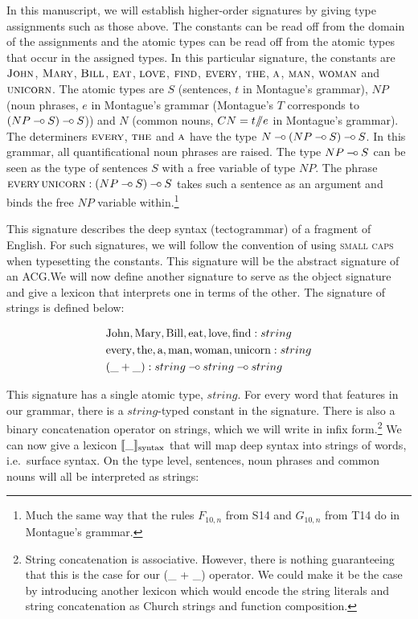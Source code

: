 In this manuscript, we will establish higher-order signatures by giving
type assignments such as those above. The constants can be read off from
the domain of the assignments and the atomic types can be read off from the
atomic types that occur in the assigned types. In this particular
signature, the constants are $\textsc{John}$, $\textsc{Mary}$, $\textsc{Bill}$,
$\textsc{eat}$, $\textsc{love}$, $\textsc{find}$, $\textsc{every}$, $\textsc{the}$,
$\textsc{a}$, $\textsc{man}$, $\textsc{woman}$ and $\textsc{unicorn}$. The atomic types
are $S$ (sentences, $t$ in Montague's grammar), $NP$ (noun phrases, $e$ in
Montague's grammar (Montague's $T$ corresponds to $(NP \mathbin{{-}\mkern-3.5mu{\circ}} S) \mathbin{{-}\mkern-3.5mu{\circ}} S$))
and $N$ (common nouns, $CN = t /\!\!/ e$ in Montague's grammar). The
determiners $\textsc{every}$, $\textsc{the}$ and $\textsc{a}$ have the type
$N \mathbin{{-}\mkern-3.5mu{\circ}} (NP \mathbin{{-}\mkern-3.5mu{\circ}} S) \mathbin{{-}\mkern-3.5mu{\circ}} S$. In this grammar, all quantificational noun
phrases are raised. The type $NP \mathbin{{-}\mkern-3.5mu{\circ}} S$ can be seen as the type of
sentences $S$ with a free variable of type $NP$. The phrase
$\textsc{every}\,\textsc{unicorn} : (NP \mathbin{{-}\mkern-3.5mu{\circ}} S) \mathbin{{-}\mkern-3.5mu{\circ}} S$ takes such a
sentence as an argument and binds the free $NP$ variable
within.\footnote{Much the same way that the rules $F_{10,n}$ from S14 and
  $G_{10,n}$ from T14 do in Montague's grammar.}

This signature describes the deep syntax (tectogrammar) of a fragment of
English. For such signatures, we will follow the convention of using
\textsc{small caps} when typesetting the constants. This signature will be
the abstract signature of an ACG.\@ We will now define another signature to
serve as the object signature and give a lexicon that interprets one in
terms of the other. The signature of strings is defined below:

\begin{align*}
  &\text{John}, \text{Mary}, \text{Bill}, \text{eat}, \text{love}, \text{find} : string \\
  &\text{every}, \text{the}, \text{a}, \text{man}, \text{woman}, \text{unicorn} : string \\
  &(\_ + \_) : string \mathbin{{-}\mkern-3.5mu{\circ}} string \mathbin{{-}\mkern-3.5mu{\circ}} string
\end{align*}

This signature has a single atomic type, $string$. For every word that
features in our grammar, there is a $string$-typed constant in the
signature. There is also a binary concatenation operator on strings, which
we will write in infix form.\footnote{String concatenation is
  associative. However, there is nothing guaranteeing that this is the case
  for our (\_ + \_) operator. We could make it be the case by introducing
  another lexicon which would encode the string literals and string
  concatenation as Church strings and function composition.} We can now
give a lexicon $\llbracket \_ \rrbracket_{\text{syntax}}$ that will map deep syntax into strings of
words, i.e.\ surface syntax. On the type level, sentences, noun phrases and
common nouns will all be interpreted as strings:

